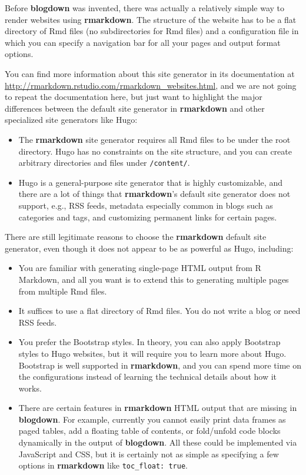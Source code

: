 \documentclass[12pt,]{krantz}
\theoremstyle{definition}
\theoremstyle{definition}
\theoremstyle{definition}
\theoremstyle{remark}
\begin{document}
Before \textbf{blogdown} was invented,
there was actually a relatively simple way to render websites using
\textbf{rmarkdown}. The structure of the website has to be a flat
directory of Rmd files (no subdirectories for Rmd files) and a
configuration file in which you can specify a navigation bar for all
your pages and output format options.

You can find more information about this site generator in its
documentation at
\url{http://rmarkdown.rstudio.com/rmarkdown_websites.html}, and we are
not going to repeat the documentation here, but just want to highlight
the major differences between the default site generator in
\textbf{rmarkdown} and other specialized site generators like Hugo:

\begin{itemize}
\item
  The \textbf{rmarkdown} site generator requires all Rmd files to be
  under the root directory. Hugo has no constraints on the site
  structure, and you can create arbitrary directories and files under
  \texttt{/content/}.
\item
  Hugo is a general-purpose site generator that is highly customizable,
  and there are a lot of things that \textbf{rmarkdown}'s default site
  generator does not support, e.g., RSS feeds, metadata especially
  common in blogs such as categories and tags, and customizing permanent
  links for certain pages.
\end{itemize}

There are still legitimate reasons to choose the \textbf{rmarkdown}
default site generator, even though it does not appear to be as powerful
as Hugo, including:

\begin{itemize}
\item
  You are familiar with generating single-page HTML output from R
  Markdown, and all you want is to extend this to generating multiple
  pages from multiple Rmd files.
\item
  It suffices to use a flat directory of Rmd files. You do not write a
  blog or need RSS feeds.
\item
  You prefer the Bootstrap styles. In theory, you can also apply
  Bootstrap styles to Hugo websites, but it will require you to learn
  more about Hugo. Bootstrap is well supported in \textbf{rmarkdown},
  and you can spend more time on the configurations instead of learning
  the technical details about how it works.
\item
  There are certain features in \textbf{rmarkdown} HTML output that are
  missing in \textbf{blogdown}. For example, currently you cannot easily
  print data frames as paged tables, add a floating table of contents,
  or fold/unfold code blocks dynamically in the output of
  \textbf{blogdown}. All these could be implemented via JavaScript and
  CSS, but it is certainly not as simple as specifying a few options in
  \textbf{rmarkdown} like \texttt{toc\_float:\ true}.
\end{itemize}
\end{document}

